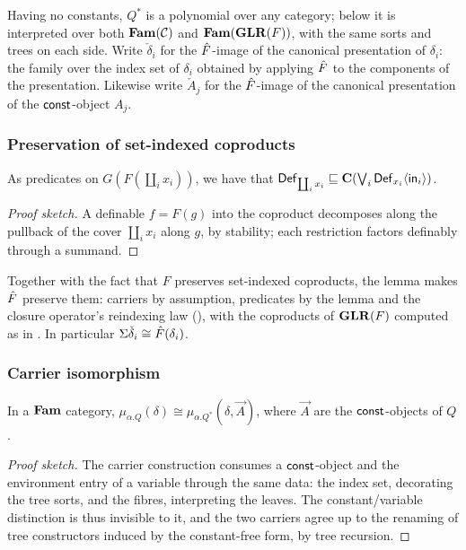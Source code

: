 \noindent
Having no constants,
$Q^{*}$ is a polynomial over any category; below it is interpreted over both $\mathbf{Fam}(\mathcal{C})$ and
$\mathbf{Fam}(\mathbf{GLR}(F))$, with the same sorts and trees on each side. Write
$\check{\delta}_i$ for the $\hat{F}$-image of the canonical presentation of $\delta_i$: the family
over the index set of $\delta_i$ obtained by applying $\hat{F}$ to the components of the
presentation. Likewise write $\check{A}_j$ for the $\hat{F}$-image of the canonical presentation of
the $\mathsf{const}$-object $A_j$.

\subsubsection{Preservation of set-indexed coproducts}

\begin{lemma}
\label{lem:conservativity:definable-coproducts}
As predicates on $G(F(\coprod_i x_i))$, we have that
$\mathsf{Def}_{\coprod_i x_i} \sqsubseteq \mathbf{C}(\bigvee_i \mathsf{Def}_{x_i}\langle
\mathsf{in}_i \rangle)$.
\end{lemma}

\begin{proof}[Proof sketch]
A definable $f = F(g)$ into the coproduct decomposes along the pullback of the cover
$\coprod_i x_i$ along $g$, by stability; each restriction factors definably through a summand.
\end{proof}

Together with the fact that $F$ preserves set-indexed coproducts, the lemma makes $\hat{F}$
preserve them: carriers by assumption, predicates by the lemma and the closure operator's
reindexing law (), with the coproducts of $\mathbf{GLR}(F)$
computed as in . In particular $\Sigma\check{\delta}_i \cong
\hat{F}(\delta_i)$.

\subsubsection{Carrier isomorphism}

\begin{lemma}
\label{lem:conservativity:constant-free-form}
In a $\mathbf{Fam}$ category, $\mu_{\alpha.Q}(\delta) \cong \mu_{\alpha.Q^{*}}(\delta, \vec{A})$,
where $\vec{A}$ are the $\mathsf{const}$-objects of $Q$.
\end{lemma}

\begin{proof}[Proof sketch]
The carrier construction consumes a $\mathsf{const}$-object and the environment entry of a variable
through the same data: the index set, decorating the tree sorts, and the fibres, interpreting the
leaves. The constant/variable distinction is thus invisible to it, and the two carriers agree up to
the renaming of tree constructors induced by the constant-free form, by tree recursion.
\end{proof}

